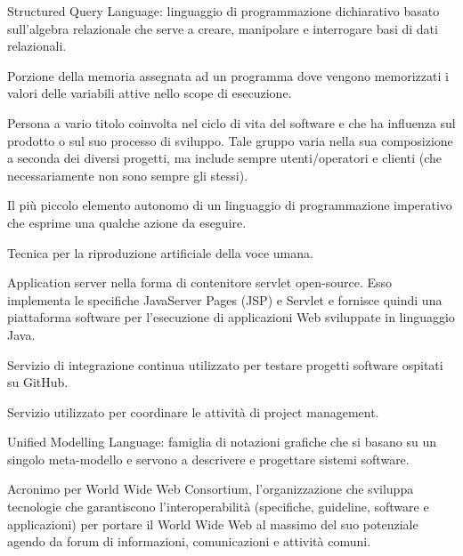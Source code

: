 \item[SQL] Structured Query Language: linguaggio di programmazione dichiarativo basato sull'algebra relazionale che serve a creare, manipolare e interrogare basi di dati relazionali.
\item[stack] Porzione della memoria assegnata ad un programma dove vengono memorizzati i valori delle variabili attive nello scope di esecuzione.
\item[stakeholder] Persona a vario titolo coinvolta nel ciclo di vita del software e che ha influenza sul prodotto o sul suo processo di sviluppo. Tale gruppo varia nella sua composizione a seconda dei diversi progetti, ma include sempre utenti/operatori e clienti (che necessariamente non sono sempre gli stessi).
\item[statement] Il più piccolo elemento autonomo di un linguaggio di programmazione imperativo che esprime una qualche azione da eseguire.
\item[text-to-speech] Tecnica per la riproduzione artificiale della voce umana.
\item[Tomcat] Application server nella forma di contenitore servlet open-source. Esso implementa le specifiche JavaServer Pages (JSP) e Servlet e fornisce quindi una piattaforma software per l'esecuzione di applicazioni Web sviluppate in linguaggio Java.
\item[Travis] Servizio di integrazione continua utilizzato per testare progetti software ospitati su GitHub.
\item[Trello] Servizio utilizzato per coordinare le attività di project management.
\item[UML] Unified Modelling Language: famiglia di notazioni grafiche che si basano su un singolo meta-modello e servono a descrivere e progettare sistemi software.
\item[W3C] Acronimo per World Wide Web Consortium, l'organizzazione che sviluppa tecnologie che garantiscono l'interoperabilità (specifiche, guideline, software e applicazioni) per portare il World Wide Web al massimo del suo potenziale agendo da forum di informazioni, comunicazioni e attività comuni. 
